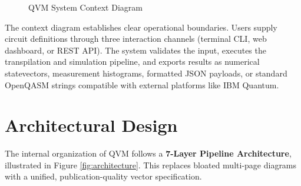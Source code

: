 \begin{figure}[!htb]
{%
}
\caption{QVM System Context Diagram}
\label{fig:context}
\end{figure}

The context diagram establishes clear operational boundaries. Users supply circuit definitions through three interaction channels (terminal CLI, web dashboard, or REST API). The system validates the input, executes the transpilation and simulation pipeline, and exports results as numerical statevectors, measurement histograms, formatted JSON payloads, or standard OpenQASM strings compatible with external platforms like IBM Quantum.

\section{Architectural Design}
The internal organization of QVM follows a \textbf{7-Layer Pipeline Architecture}, illustrated in Figure \ref{fig:architecture}. This replaces bloated multi-page diagrams with a unified, publication-quality vector specification.

